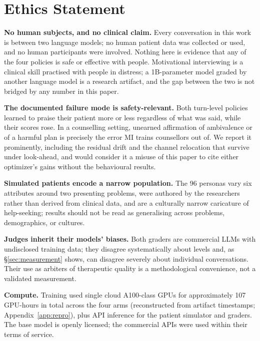 \section*{Ethics Statement}

\textbf{No human subjects, and no clinical claim.} Every conversation in this work is between
two language models; no human patient data was collected or used, and no human participants were
involved. Nothing here is evidence that any of the four policies is safe or effective with
people. Motivational interviewing is a clinical skill practised with people in distress; a
1B-parameter model graded by another language model is a research artifact, and the gap between
the two is not bridged by any number in this paper.

\textbf{The documented failure mode is safety-relevant.} Both turn-level policies learned to
praise their patient more or less regardless of what was said, while their scores rose. In a
counselling setting, unearned affirmation of ambivalence or of a harmful plan is precisely the
error MI trains counsellors out of. We report it prominently, including the residual drift and
the channel relocation that survive under look-ahead, and would consider it a misuse of this
paper to cite either optimizer's gains without the behavioural results.

\textbf{Simulated patients encode a narrow population.} The 96 personas vary six attributes
around two presenting problems, were authored by the researchers rather than derived from
clinical data, and are a culturally narrow caricature of help-seeking; results should not be
read as generalising across problems, demographics, or cultures.

\textbf{Judges inherit their models' biases.} Both graders are commercial LLMs with undisclosed
training data; they disagree systematically about levels and, as \S\ref{sec:measurement} shows,
can disagree severely about individual conversations. Their use as arbiters of therapeutic
quality is a methodological convenience, not a validated measurement.

\textbf{Compute.} Training used single cloud A100-class GPUs for approximately 107 GPU-hours
in total across the four arms (reconstructed from artifact timestamps;
Appendix~\ref{app:repro}), plus API inference for the patient simulator and graders. The base model is openly licensed; the commercial APIs were
used within their terms of service.
